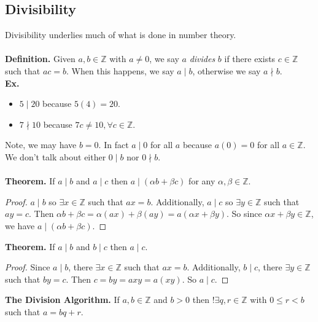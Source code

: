 \documentclass[class=article, crop=false]{standalone}
\def\integers{{\mathbb Z}}
\begin{document}
\subsection{Divisibility}
Divisibility underlies much of what is done in number theory.\\\\
\textbf{Definition.} Given $a,b\in\integers$ with $a\neq 0$, we say $a$ \emph{divides} $b$ if there exists $c\in\integers$
such that $ac=b$. When this happens, we say $a\mid b$, otherwise we say $a\nmid b$.\\
\textbf{Ex.}
\begin{itemize}
	\item $5\mid 20$ because $5(4) =20$.
	\item $7\nmid 10$ because $7c\neq 10, \forall c\in\integers$.
\end{itemize}
Note, we may have $b=0$. In fact $a\mid 0$ for all $a$ because $a(0)=0$ for all $a\in\integers$. We don't talk about
either $0\mid b$ nor $0\nmid b$.\\\\
\textbf{Theorem.} If $a\mid b$ and $a\mid c$ then $a\mid (\alpha b + \beta c)$ for any $\alpha, \beta\in\integers$.
\begin{proof}
	$a\mid b$ so $\exists x\in\integers$ such that $ax=b$. Additionally, $a\mid c$ so $\exists y\in\integers$ such that
	$ay=c$. Then $\alpha b + \beta c = \alpha(ax) + \beta(ay) = a(\alpha x + \beta y)$. So since $\alpha x + \beta y \in \integers$,
	we have $a\mid (\alpha b + \beta c)$.
\end{proof}
\noindent\textbf{Theorem.} If $a\mid b$ and $b\mid c$ then $a\mid c$.
\begin{proof}
	Since $a\mid b$, there $\exists x\in\integers$ such that $ax=b$. Additionally, $b\mid c$, there $\exists y\in\integers$
	such that $by=c$. Then $c=by=axy=a(xy)$. So $a\mid c$.
\end{proof}
\noindent\textbf{The Division Algorithm.} If $a,b\in\integers$ and $b>0$ then $!\exists q,r\in\integers$ with $0\leq r<b$
such that $a=bq+r$.
\end{document}
